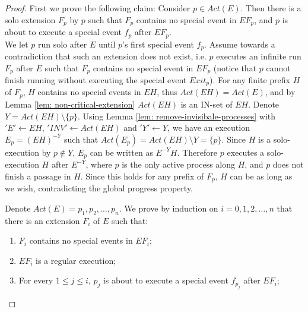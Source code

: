 \begin{proof}
	First we prove the following claim: Consider $p \in Act(E)$. Then there is a solo extension $F_p$ by $p$ such that $F_p$ contains no special event in $E F_p$, and $p$ is about to execute a special event $f_p$ after $E F_p$.
	\\ We let $p$ run solo after $E$ until $p$'s first special event $f_p$. Assume towards a contradiction that such an extension does not exist, i.e. $p$ executes an infinite run $F_p$ after $E$ such that $F_p$ contains no special event in $E F_p$ (notice that $p$ cannot finish running without executing the special event $Exit_p$). For any finite prefix $H$ of $F_p$, $H$ contains no special events in $E H$, thus $Act(E H) = Act(E)$, and by Lemma \ref{lem: non-critical-extension} $Act(E H)$ is an IN-set of $E H$.  Denote $Y = Act(E H) \setminus \{p\}$. Using Lemma \ref{lem: remove-invisibale-processes} with $'E' \leftarrow E H$, $'INV' \leftarrow Act(E H)$ and $'Y' \leftarrow Y$, we have an execution $E_p = (E H)^{-Y}$ such that $Act(E_p) = Act(E H) \setminus Y = \{p\}$. Since $H$ is a solo-execution by $p \notin Y$, $E_p$ can be written as $E^{-Y} H$. Therefore $p$ executes a solo-execution $H$ after $E^{-Y}$, where $p$ is the only active process along $H$, and $p$ does not finish a passage in $H$. Since this holds for any prefix of $F_p$, $H$ can be as long as we wish, contradicting the global progress property.
	
	Denote $Act(E) = {p_1, p_2, \ldots, p_n}$. We prove by induction on $i = 0,1,2,\ldots,n$ that there is an extension $F_i$ of $E$ such that:
	\begin{enumerate}
		\item $F_i$ contains no special events in $E F_i$;
		\item $E F_i$ is a regular execution;
		\item For every $1 \leq j \leq i$, $p_j$ is about to execute a special event $f_{p_j}$ after $E F_i$;
	\end{enumerate}
	

\end{proof}
